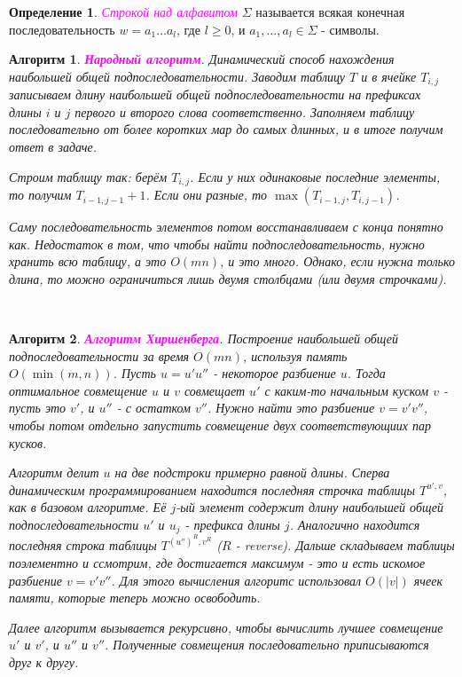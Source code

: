 \documentclass[a4paper]{article}
\theoremstyle{indented}
\newtheorem{alg}{Алгоритм}
\theoremstyle{definition}
\newtheorem{defn}{Определение}
\theoremstyle{remark}
\begin{document}
\begin{defn}
    \textcolor{magenta}{\hypertarget{d2}{\textit{Строкой над алфавитом}}} $\Sigma$ называется всякая конечная последовательность $w=a_1\ldots a_l$, где $l\geq 0$, и $a_1, \ldots, a_l \in \Sigma$ - символы.
\end{defn}

\begin{alg}
    \textcolor{magenta}{\hypertarget{t8}{\textbf{Народный алгоритм}}}. Динамический способ нахождения наибольшей общей подпоследовательности. Заводим таблицу $T$ и в ячейке $T_{i, j}$ записываем длину наибольшей общей подпоследовательности на префиксах длины $i$ и $j$ первого и второго слова соответственно. Заполняем таблицу последовательно от более коротких мар до самых длинных, и в итоге получим ответ в задаче. \ 

    Строим таблицу так: берём $T_{i, j}$. Если у них одинаковые последние элементы, то получим $T_{i-1, j-1}+1$. Если они разные, то $\max({T_{i-1, j}, T_{i, j-1}})$. \ 

    Саму последовательность элементов потом восстанавливаем с конца понятно как. Недостаток в том, что чтобы найти подпоследовательность, нужно хранить всю таблицу, а это $O(mn)$, и это много. Однако, если нужна только длина, то можно ограничиться лишь двумя столбцами (или двумя строчками).
\end{alg} \

\begin{alg}
    \textcolor{magenta}{\hypertarget{t9}{\textbf{Алгоритм Хиршенберга}}}. Построение наибольшей общей подпоследовательности за время $O(mn)$, используя память $O(\min(m, n))$. Пусть $u=u'u''$ - некоторое разбиение $u$. Тогда оптимальное совмещение $u$ и $v$ совмещает $u'$ с каким-то начальным куском $v$ - пусть это $v'$, и $u''$ - с остатком $v''$. Нужно найти это разбиение $v=v'v''$, чтобы потом отдельно запустить совмещение двух соответствующиих пар кусков. \ 

    Алгоритм делит $u$ на две подстроки примерно равной длины. Сперва динамическим программированием находится последняя строчка таблицы $T^{u', v}$, как в базовом алгоритме. Её $j$-ый элемент содержит длину наибольшей общей подпоследовательности $u'$ и $u_j$ - префикса длины $j$. Аналогично находится последняя строка таблицы $T^{(u'')^R, v^R}$ ($R$ - reverse). Дальше складываем таблицы поэлементно и ссмотрим, где достигается максимум - это и есть искомое разбиение $v=v'v''$. Для этого вычисления алгоритс использовал $O(|v|)$ ячеек памяти, которые теперь можно освободить. \ 

    Далее алгоритм вызывается рекурсивно, чтобы вычислить лучшее совмещение $u'$ и $v'$, и $u''$ и $v''$. Полученные совмещения последовательно приписываются друг к другу.
\end{alg} \
\end{document}
